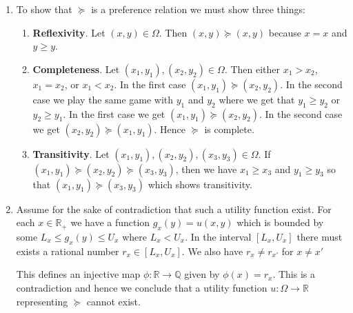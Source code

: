 \documentclass[a4paper]{article}
\begin{document}
  \begin{exercise}{2}
    \begin{enumerate}[label=(\alph*)]
      \item To show that $ \succeq $ is a preference relation we must show three things:
        \begin{enumerate}[label=(\arabic*)]
          \item \textbf{Reflexivity}. Let $ (x,y) \in \Omega $. Then $ (x,y) \succeq (x, y) $ because $ x = x $ and
            $ y \geq y $.
          \item \textbf{Completeness}. Let $ (x_1, y_1), (x_2, y_2) \in \Omega $. Then either $ x_1 > x_2 $, $ x_1 = x_2 $, or $ x_1 < x_2 $. In the first case $ (x_1, y_1) \succeq (x_2, y_2) $. In the second case we play the same game with $ y_1 $ and $ y_2 $ where we get that
            $ y_1 \geq y_2 $ or $ y_2 \geq y_1 $. In the first case we get $ (x_1, y_1) \succeq (x_2, y_2) $. In the second case we get $ (x_2, y_2) \succeq (x_1, y_1) $. Hence $ \succeq $ is complete.
          \item \textbf{Transitivity}. Let $ (x_1, y_1), (x_2, y_2), (x_3, y_3) \in \Omega $. If $ (x_1, y_1) \succeq (x_2, y_2) \succeq (x_3, y_3) $, then we have
            $ x_1 \geq x_3 $ and $ y_1 \geq y_3 $ so that $ (x_1, y_1) \succeq  (x_3, y_3) $ which shows transitivity.
        \end{enumerate}

      \item Assume for the sake of contradiction that such a utility function exist. For each $ x \in \mathbb{R}_+ $ we have a function $ g_x(y) = u(x,y) $ which is bounded by some $ L_x \leq g_x(y) \leq U_x $ where $ L_x < U_x $. In the interval $ \left[ L_x, U_x \right] $ there must exists a rational number $ r_x \in \left[ L_x, U_x \right] $. We also have $ r_x \neq r_{x'} $ for $ x \neq x' $

        This defines an injective map $ \phi: \mathbb{R} \to \mathbb{Q} $ given by $ \phi(x) = r_x $. This is a contradiction and hence we conclude that a utility function $ u: \Omega \to \mathbb{R} $ representing $ \succeq $ cannot exist. \end{enumerate}
  \end{exercise}
\end{document}
